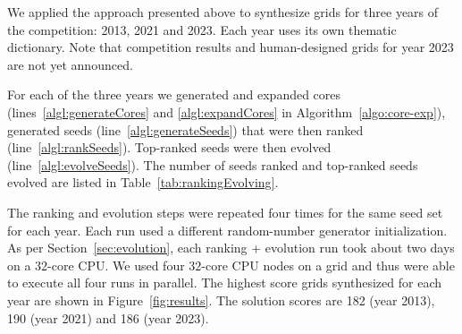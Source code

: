 We applied the approach presented above to synthesize grids for three years of the competition: 2013, 2021 and 2023. Each year uses its own thematic dictionary. Note that competition results and human-designed grids for year 2023 are not yet announced.

For each of the three years we generated and expanded cores (lines~\ref{algl:generateCores} and \ref{algl:expandCores} in Algorithm~\ref{algo:core-exp}), generated seeds (line~\ref{algl:generateSeeds}) that were then ranked (line~\ref{algl:rankSeeds}). Top-ranked seeds were then evolved (line~\ref{algl:evolveSeeds}). The number of seeds ranked and top-ranked seeds evolved are listed in Table~\ref{tab:rankingEvolving}.


The ranking and evolution steps were repeated four times for the same seed set for each year. Each run used a different random-number generator initialization. As per Section~\ref{sec:evolution}, each ranking + evolution run took about two days on a $32$-core CPU. We used four $32$-core CPU nodes on a grid and thus were able to execute all four runs in parallel. The highest score grids synthesized for each year are shown in Figure~\ref{fig:results}. The solution scores are 182 (year 2013), 190 (year 2021) and 186 (year 2023).



